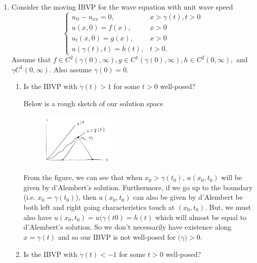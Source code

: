 \documentclass[a4paper,12pt]{article}
\begin{document}
\begin{enumerate}[label = \arabic*.]
	\item Consider the moving IBVP for the wave equation with unit wave speed
	\[
		\begin{cases}
			u_{tt} - u_{xx} = 0, & x > \gamma(t), t > 0 \\
			u(x,0) = f(x), & x > 0 \\
			u_t(x,0) = g(x), & x > 0 \\
			u(\gamma(t), t) = h(t), & t > 0.
		\end{cases}
	\]
	Assume that $ f \in C^2(\gamma(0), \infty), g \in C^1(\gamma(0), \infty), h \in C^2(0,\infty), $ and $ \gamma C^1(0, \infty) $. Also assume $ \gamma(0) = 0 $.
	
	\begin{enumerate}[label = (\alph*)]
		\item Is the IBVP with $ \dot{\gamma}(t) > 1 $ for some $ t > 0 $ well-posed?
		
		Below is a rough sketch of our solution space
		\begin{figure}[h!]
			\centering
			\includegraphics[width = 0.35\textwidth]{images/a.png}
		\end{figure}
		From the figure, we can see that when $ x_0 > \gamma(t_0) $, $ u(x_0, t_0) $ will be given by d'Alembert's solution. Furthermore, if we go up to the boundary (i.e. $ x_0 = \gamma(t_0) $), then $ u(x_0, t_0) $ can also be given by d'Alembert be both left and right going characteristics touch at $ (x_0, t_0) $. But, we must also have $ u(x_0, t_0) = u(\gamma(t0) = h(t) $ which will almost be equal to d'Alembert's solution. So we don't necessarily have existence along $ x = \gamma(t) $ and so our IBVP is not well-posed for $ \dot(\gamma) > 0 $.
		
		\item Is the IBVP with $ \dot{\gamma}(t) < -1 $ for some $ t > 0 $ well-posed?
		

\end{enumerate}
\end{enumerate}
\end{document}
